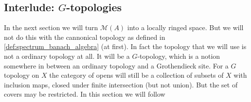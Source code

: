 \subsection{Interlude: $G$-topologies} \label{sec:interlude_g_topologies}

In the next section we will turn $\mathcal{M} (A)$ into a locally ringed space. 
But we will not do this with the cannonical topology as defined in \cref{def:spectrum_banach_algebra} (at first). 
In fact the topology that we will use is not a ordinary topology at all. 
It will be a $G$-topology, which is a notion somewhere in between an ordinary topology and a Grothendieck site. 
For a $G$ topology on $X$
the category of opens will still be a collection of subsets of $X$ with inclusion maps, closed under finite intersection (but not union). But the set of covers may be restricted. 
In this section we will follow \cite[][sec. 9.1.]{siegfriedboschNonArchimedeanAnalysisSystematic1984}

